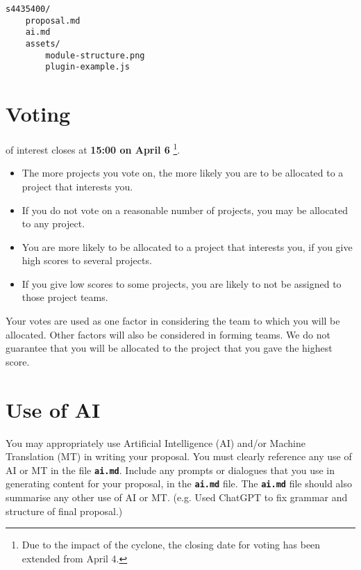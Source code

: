 \documentclass{csse4400}
\begin{document}
\begin{minipage}{\textwidth}
\begin{verbatim}
s4435400/
    proposal.md
    ai.md
    assets/
        module-structure.png
        plugin-example.js
\end{verbatim}
\end{minipage}


\section{Voting}
of interest closes at \textbf{15:00 on April 6}%
\footnote{Due to the impact of the cyclone, the closing date for voting has been extended from April 4.}.

\begin{itemize}
    \item The more projects you vote on, the more likely you are to be allocated to a project that interests you.
    \item If you do not vote on a reasonable number of projects, you may be allocated to any project.
    \item You are more likely to be allocated to a project that interests you,
          if you give high scores to several projects.
    \item If you give low scores to some projects, you are likely to not be assigned to those project teams.
\end{itemize}

\noindent
Your votes are used as one factor in considering the team to which you will be allocated.
Other factors will also be considered in forming teams.
We do not guarantee that you will be allocated to the project that you gave the highest score.


\section{Use of AI}
You may appropriately use Artificial Intelligence (AI) and/or Machine Translation (MT) in writing your proposal.
You must clearly reference any use of AI or MT in the file \textbf{\texttt{ai.md}}.
Include any prompts or dialogues that you use in generating content for your proposal, in the \textbf{\texttt{ai.md}} file.
The \textbf{\texttt{ai.md}} file should also summarise any other use of AI or MT.
(e.g. Used ChatGPT to fix grammar and structure of final proposal.)
\end{document}
